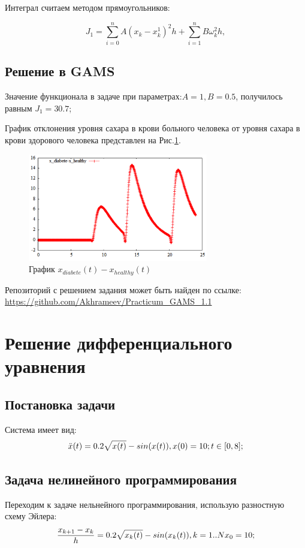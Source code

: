 \documentclass[14pt]{article}
\begin{document}
Интеграл считаем методом прямоугольников:

$$
    J_1 =\sum_{i=0}^n A(x_k-x_k^1)^2 h + \sum_{i=1}^n B\omega_k^2 h,
$$


\subsection{Решение в GAMS}

Значение функционала в  задаче при параметрах:$A=1, B=0.5$, получилось равным $J_1 = 30.7$;

График отклонения уровня сахара в крови больного человека от уровня сахара в крови здорового человека представлен на Рис.\ref{task1_dx}.

\begin{figure}[t!]
\centering
\includegraphics[width=0.7\textwidth]{x_diabete-x_healthy}
\caption{График $x_{diabete}(t)-x_{healthy}(t)$}
\label{task1_dx}
\end{figure}

Репозиторий с решением задания может быть найден по ссылке:
\url{https://github.com/Akhrameev/Practicum_GAMS_1.1}

\clearpage 

\newpage

\section{Решение дифференциального уравнения}

\subsection{Постановка задачи}
Система имеет вид:
\begin{equation}\label{syst2_oo}
\ddot{x}(t)=0.2\sqrt{x(t)}-sin(x(t)),\\
x(0)=10; t\in[0,8];
\end{equation}

\subsection{Задача нелинейного программирования}
Переходим к задаче нельнейного программирования, использую разностную схему Эйлера:
\begin{equation}
\frac{x_{k+1}-x_k}{h}=0.2\sqrt{x_k(t)}-sin(x_k(t)), k=1..N\\
x_0=10;
\end{equation}
\end{document}
